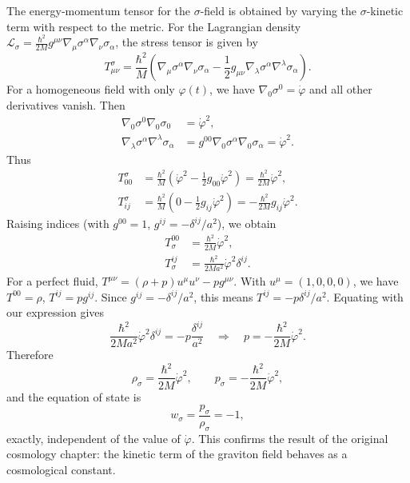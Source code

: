 \documentclass[11pt,a4paper]{article}
\begin{document}
The energy‑momentum tensor for the \(\sigma\)-field is obtained by varying the \(\sigma\)-kinetic term with respect to the metric. For the Lagrangian density \(\mathcal{L}_\sigma = \frac{\hbar^2}{2M} g^{\mu\nu} \nabla_\mu \sigma^\alpha \nabla_\nu \sigma_\alpha\), the stress tensor is given by
\begin{equation}
T_{\mu\nu}^{\sigma} = \frac{\hbar^2}{M} \left( \nabla_\mu \sigma^\alpha \nabla_\nu \sigma_\alpha - \frac{1}{2} g_{\mu\nu} \nabla_\lambda \sigma^\alpha \nabla^\lambda \sigma_\alpha \right).
\end{equation}
For a homogeneous field with only \(\varphi(t)\), we have \(\nabla_0 \sigma^0 = \dot\varphi\) and all other derivatives vanish. Then
\begin{align}
\nabla_0 \sigma^0 \nabla_0 \sigma_0 &= \dot\varphi^2, \\
\nabla_\lambda \sigma^\alpha \nabla^\lambda \sigma_\alpha &= g^{00} \nabla_0 \sigma^\alpha \nabla_0 \sigma_\alpha = \dot\varphi^2.
\end{align}
Thus
\begin{align}
T_{00}^{\sigma} &= \frac{\hbar^2}{M} \left( \dot\varphi^2 - \frac{1}{2} g_{00} \dot\varphi^2 \right) = \frac{\hbar^2}{2M} \dot\varphi^2, \\
T_{ij}^{\sigma} &= \frac{\hbar^2}{M} \left( 0 - \frac{1}{2} g_{ij} \dot\varphi^2 \right) = -\frac{\hbar^2}{2M} g_{ij} \dot\varphi^2.
\end{align}
Raising indices (with \(g^{00}=1\), \(g^{ij} = -\delta^{ij}/a^2\)), we obtain
\begin{align}
T^{00}_{\sigma} &= \frac{\hbar^2}{2M} \dot\varphi^2, \\
T^{ij}_{\sigma} &= \frac{\hbar^2}{2M a^2} \dot\varphi^2 \delta^{ij}.
\end{align}
For a perfect fluid, \(T^{\mu\nu} = (\rho + p) u^\mu u^\nu - p g^{\mu\nu}\). With \(u^\mu = (1,0,0,0)\), we have \(T^{00} = \rho\), \(T^{ij} = p g^{ij}\). Since \(g^{ij} = -\delta^{ij}/a^2\), this means \(T^{ij} = -p \delta^{ij}/a^2\). Equating with our expression gives
\begin{equation}
\frac{\hbar^2}{2M a^2} \dot\varphi^2 \delta^{ij} = -p \frac{\delta^{ij}}{a^2} \quad\Longrightarrow\quad p = -\frac{\hbar^2}{2M} \dot\varphi^2.
\end{equation}
Therefore
\begin{equation}
\rho_\sigma = \frac{\hbar^2}{2M} \dot\varphi^2, \qquad p_\sigma = -\frac{\hbar^2}{2M} \dot\varphi^2,
\end{equation}
and the equation of state is
\begin{equation}
\boxed{w_\sigma = \frac{p_\sigma}{\rho_\sigma} = -1},
\end{equation}
exactly, independent of the value of \(\dot\varphi\). This confirms the result of the original cosmology chapter: the kinetic term of the graviton field behaves as a cosmological constant.
\end{document}
